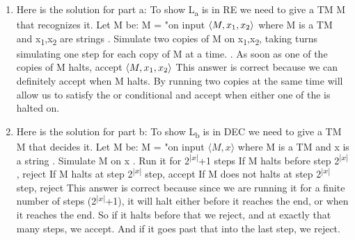 \documentclass[11pt]{article}
\begin{document}
\begin{enumerate}

\item Here is the solution for part a:
\newline
\newline
To show L\textsubscript{a} is in RE we need to give a TM M that recognizes it. Let M be:
\newline
\newline
M = "on input  $\langle M, x\textsubscript{1},x\textsubscript{2} \rangle$ where M is a TM and x\textsubscript{1},x\textsubscript{2} are strings
. Simulate two copies of M on x\textsubscript{1},x\textsubscript{2}, taking turns simulating one step for each copy of M at a time. 
. As soon as one of the copies of M halts, accept $\langle M, x\textsubscript{1},x\textsubscript{2} \rangle$
\newline
\newline
This answer is correct because we can definitely accept when M halts. By running two copies at the same time will allow us to satisfy the or conditional and accept when either one of the is halted on. 

\item Here is the solution for part b:
\newline
\newline
To show L\textsubscript{b} is in DEC we need to give a TM M that decides it. Let M be:
\newline
\newline
M = "on input $\langle M, x\rangle$ where M is a TM and x is a string
. Simulate M on x
. Run it for 2\textsuperscript{$|x|$}+1 steps
\newline
If M halts before step 2\textsuperscript{$|x|$}, reject
\newline
If M halts at step 2\textsuperscript{$|x|$} step, accept
\newline
If M does not halts at step 2\textsuperscript{$|x|$} step, reject
\newline
\newline
This answer is correct because since we are running it for a finite number of steps (2\textsuperscript{$|x|$}+1), it will halt either before it reaches the end, or when it reaches the end. So if it halts before that we reject, and at exactly that many steps, we accept. And if it goes past that into the last step, we reject.
\end{enumerate}
\newpage
\end{document}

